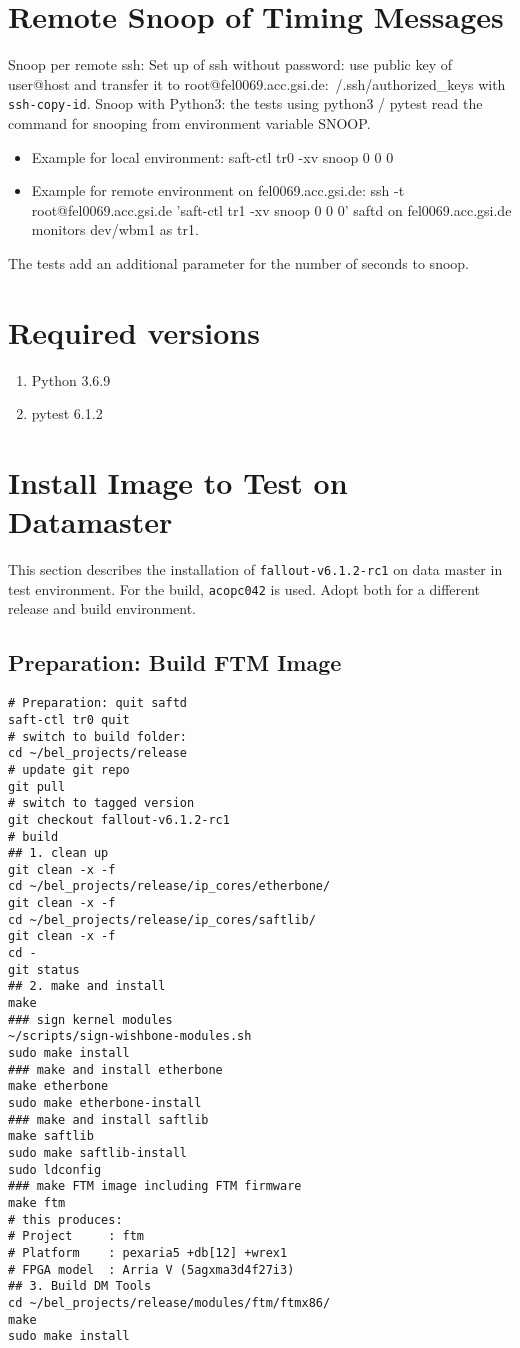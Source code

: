 \documentclass[12pt,a4paper]{report}
\begin{document}
\section{Remote Snoop of Timing Messages}
Snoop per remote ssh: Set up of ssh without password: use public key of user@host and transfer it to root@fel0069.acc.gsi.de:~/.ssh/authorized\_keys with \texttt{ssh-copy-id}.
Snoop with Python3: the tests using python3 / pytest read the command for snooping from environment variable SNOOP.
\begin{itemize}
\item Example for local environment: saft-ctl tr0 -xv snoop 0 0 0
\item Example for remote environment on fel0069.acc.gsi.de: ssh -t root@fel0069.acc.gsi.de 'saft-ctl tr1 -xv snoop 0 0 0' \linebreak
saftd on fel0069.acc.gsi.de monitors dev/wbm1 as tr1.
\end{itemize}
The tests add an additional parameter for the number of seconds to snoop.

\section{Required versions}
\begin{enumerate}
\item Python 3.6.9
\item pytest 6.1.2
\end{enumerate}

\section{Install Image to Test on Datamaster}
This section describes the installation of \texttt{fallout-v6.1.2-rc1} on data master in test environment.
For the build, \texttt{acopc042} is used. Adopt both for a different release and build environment.

\subsection{Preparation: Build FTM Image}
\begin{verbatim}
# Preparation: quit saftd
saft-ctl tr0 quit
# switch to build folder:
cd ~/bel_projects/release
# update git repo
git pull
# switch to tagged version
git checkout fallout-v6.1.2-rc1
# build
## 1. clean up
git clean -x -f
cd ~/bel_projects/release/ip_cores/etherbone/
git clean -x -f
cd ~/bel_projects/release/ip_cores/saftlib/
git clean -x -f
cd -
git status
## 2. make and install
make
### sign kernel modules
~/scripts/sign-wishbone-modules.sh
sudo make install
### make and install etherbone
make etherbone
sudo make etherbone-install
### make and install saftlib
make saftlib
sudo make saftlib-install
sudo ldconfig
### make FTM image including FTM firmware
make ftm
# this produces:
# Project     : ftm
# Platform    : pexaria5 +db[12] +wrex1
# FPGA model  : Arria V (5agxma3d4f27i3)
## 3. Build DM Tools
cd ~/bel_projects/release/modules/ftm/ftmx86/
make
sudo make install
\end{verbatim}
\end{document}
